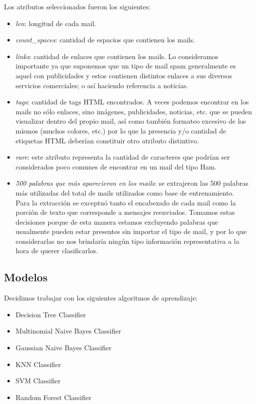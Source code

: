 \documentclass[a4paper]{article}
\newcounter{col}
\begin{document}
Los atributos seleccionados fueron los siguientes:
\begin{itemize}
\item \textit{len}: longitud de cada mail.
\item \textit{count\_spaces}: cantidad de espacios que contienen los mails.
\item \textit{links}: cantidad de enlaces que contienen los mails. Lo consideramos importante ya que suponemos que un tipo de mail spam generalmente es aquel con publicidades y estos contienen distintos enlaces a sus diversos servicios comerciales; o así haciendo referencia a noticias.
\item \textit{tags}: cantidad de tags HTML encontrados. A veces podemos encontrar en los mails no sólo enlaces, sino imágenes, publicidades, noticias, etc. que se pueden visualizar dentro del propio mail, así como también formateo excesivo de los mismos (muchos colores, etc.) por lo que la presencia y/o cantidad de etiquetas HTML deberían constituir otro atributo distintivo.
\item \textit{rare}: este atributo representa la cantidad de caracteres que podrían ser considerados poco comunes de encontrar en un mail del tipo Ham.
\item \textit{500 palabras que más aparecieron en los mails}: se extrajeron las 500 palabras más utilizadas del total de mails utilizados como base de entrenamiento. \\
Para la extracción se exceptuó tanto el encabezado de cada mail como la porción de texto que corresponde a mensajes reenviados. Tomamos estas decisiones porque de esta manera estamos excluyendo palabras que usualmente pueden estar presentes sin importar el tipo de mail, y por lo que considerarlas no nos brindaría ningún tipo información representativa a la hora de querer clasificarlos.     
\end{itemize}

\subsection{Modelos}
Decidimos trabajar con los siguientes algoritmos de aprendizaje:

\begin{itemize}
	\item Decision Tree Classifier
	\item Multinomial Naive Bayes Classifier
	\item Gaussian Naive Bayes Classifier
	\item KNN Classifier
	\item SVM Classifier
	\item Random Forest Classifier
\end{itemize}
\end{document}
